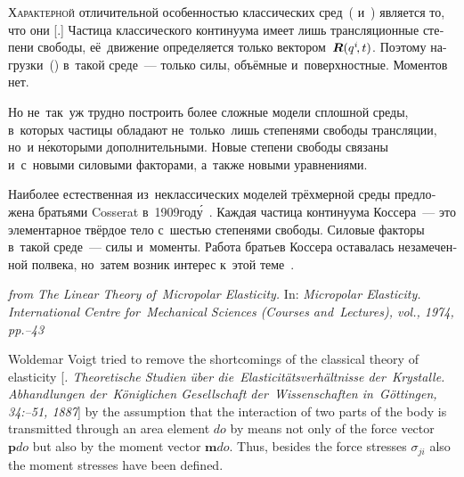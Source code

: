 \begin{otherlanguage}{russian}

\lettrine[lines=2, findent=2pt, nindent=0pt]{Х}{арактерной} отличительной особенностью классических сред~( и~) является то, что они [.] Частица классического континуума имеет лишь трансляционные степени свободы, её~движение определяется только вектором~${\bm{R}(q^i \hspace{-0.15em}, t)}$. Поэтому нагрузки~() в~такой среде~--- только силы, объёмные и~поверхностные. Моментов нет.

Но не~так~уж трудно построить более сложные модели сплошной среды, в~которых частицы обладают не~только~лишь степенями свободы трансляции, но~и н\'{е}которыми дополнительными. Новые степени свободы связаны и~с~новыми силовыми факторами, а~также новыми уравнениями.

Наиболее естественная из~неклассических моделей трёхмерной среды предложена братьями Cosserat в~1909\:год\'{у}~\cite{cosserat}. Каждая частица континуума Коссера~--- это элементарное твёрдое тело с~шестью степенями свободы. Силовые факторы в~такой среде~--- силы и~моменты. Работа братьев Коссера оставалась незамеченной полвека, но~затем возник интерес к~этой теме~\cite{mindlin.tiersten, nowacki-elasticity}.

\vspace{2mm}

\begin{tcolorbox}[breakable, enhanced, colback = orange!8, before upper={\parindent3.2ex}, parbox = false]
\small%
\setlength{\abovedisplayskip}{2pt}\setlength{\belowdisplayskip}{2pt}%

\noindent \textit{from  The Linear Theory of~Micropolar Elasticity.} In: \textit{Micropolar Elasticity. International Centre for~Mechanical Sciences (Courses and~Lectures), vol., 1974, pp.\hbox{--}43}

\vspace{.5em}

Woldemar Voigt tried to remove the shortcomings of the classical theory of elasticity [\textit{. Theoretische Studien über die~Elasticitätsverhältnisse der~Krystalle. Abhandlungen der~Königlichen Gesellschaft der~Wissenschaften in~Göttingen, 34:\hbox{--}51, 1887}] by the assumption that the interaction of two parts of the body is transmitted through an area element $do$ by means not only of the force vector $\bm{p}do$ but also by the moment vector $\bm{m}do$. Thus, besides the force stresses $\sigma_{ji}$ also the moment stresses have been defined.


\end{tcolorbox}
\end{otherlanguage}
